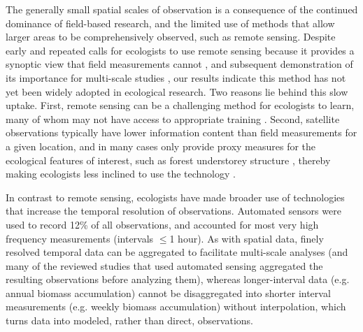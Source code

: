 \documentclass[12pt]{article}
\begin{document}
The generally small spatial scales of observation is a consequence of the continued dominance of field-based research, and the limited use of methods that allow larger areas to be comprehensively observed, such as remote sensing. Despite early and repeated calls for ecologists to use remote sensing because it provides a synoptic view that field measurements cannot \cite{turner_remote_2003, kerr_space_2003, pettorelli_satellite_2014}, and subsequent demonstration of its importance for multi-scale studies \cite{estes_habitat_2008, estes_predictive_2011}, our results indicate this method has not yet been widely adopted in ecological research. Two reasons lie behind this slow uptake. First, remote sensing can be a challenging method for ecologists to learn, many of whom may not have access to appropriate training \cite{pettorelli_satellite_2014}. Second, satellite observations typically have lower information content than field measurements for a given location, and in many cases only provide proxy measures for the ecological features of interest, such as forest understorey structure \cite{estes_remote_2010}, thereby making ecologists less inclined to use the technology \cite{turner_remote_2003}. 

In contrast to remote sensing, ecologists have made broader use of technologies that increase the temporal resolution of observations. Automated sensors were used to record 12\% of all observations, and accounted for most very high frequency measurements (intervals $\leq$1 hour). As with spatial data, finely resolved temporal data can be aggregated to facilitate multi-scale analyses (and many of the reviewed studies that used automated sensing aggregated the resulting observations before analyzing them), whereas longer-interval data (e.g. annual biomass accumulation) cannot be disaggregated into shorter interval measurements (e.g. weekly biomass accumulation) without interpolation, which turns data into modeled, rather than direct, observations. 
\end{document}
